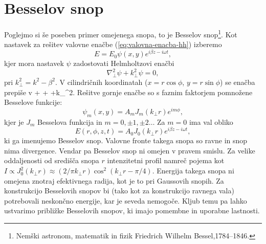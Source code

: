 \section{Besselov snop}

Poglejmo si še poseben primer omejenega snopa, to je Besselov
snop\footnote{Nemški astronom, matematik in fizik Friedrich Wilhelm Bessel,1784--1846.}. 
Kot nastavek za rešitev valovne enačbe (\ref{eq:valovna-enacba-hh})
izberemo
\begin{equation}
E=E_{0}\psi(x,y)e^{i\beta z-i\omega t},
\end{equation}
kjer mora nastavek $\psi$ zadostovati Helmholtzovi enačbi
\begin{equation}
\nabla_{\perp}^{2}\psi+k_{\perp}^{2}\psi=0,
\end{equation}
pri $k_{\perp}^{2}=k^{2}-\beta^{2}$. V cilindričnih
koordinatah ($x=r\cos\phi$, $y=r\sin\phi$) se enačba prepiše v 
\beq
{}+ 
+ +k_{\perp}^{2}.
\eeq
Rešitve gornje enačbe so s faznim faktorjem pomnožene Besselove funkcije:
\begin{equation}
\psi_m(x,y)=A_{m}J_{m}(k_{\perp}r)e^{im\phi},
\end{equation}
kjer je $J_{m}$ Besselova funkcija in $m=0,\pm1,\pm2 \ldots$ Za
$m=0$ ima val obliko
\begin{equation}
E(r,\phi,z,t)=A_{0}J_{0}(k_{\perp}r)e^{i\beta z-i \omega t},
\label{eq:Besselov-snop}
\end{equation}
ki ga imenujemo Besselov snop. Valovne fronte takega snopa so ravne 
in snop nima divergence. Vendar pa Besselov snop ni omejen v pravem smislu. Za 
velike oddaljenosti od središča snopa $r$ intenzitetni profil namreč pojema kot 
$I \propto J_{0}^{2}(k_{\perp}r)\approx(2/\pi k_{\perp}r)\cos^{2}(k_{\perp}r-\pi/4)$.
Energija takega snopa ni omejena znotraj efektivnega radija,
kot je to pri Gaussovih snopih. Za konstrukcijo Besselovih snopov
bi (tako kot za konstrukcijo ravnega vala) potrebovali neskončno energije,
kar je seveda nemogoče. Kljub temu pa lahko ustvarimo približke Besselovih 
snopov, ki imajo pomembne in uporabne lastnosti. 

